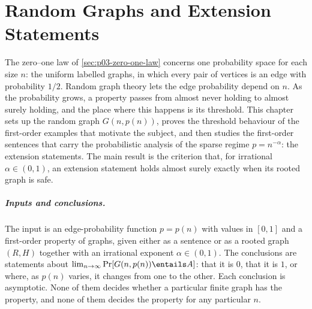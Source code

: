 \chapter{Random Graphs and Extension Statements}
\label{sec:p03-w03-p03-065-random-graphs}

The zero--one law of \cref{sec:p03-zero-one-law} concerns one probability
space for each size \(n\): the uniform labelled graphs, in which every pair of
vertices is an edge with probability \(1/2\).  Random graph theory lets the
edge probability depend on \(n\).  As the probability grows, a property passes
from almost never holding to almost surely holding, and the place where this
happens is its threshold.  This chapter sets up the random graph
\(G(n,p(n))\), proves the threshold behaviour of the first-order examples
that motivate the subject, and then studies the first-order sentences that
carry the probabilistic analysis of the sparse regime \(p=n^{-\alpha}\): the
extension statements.  The main result is the criterion that, for irrational
\(\alpha\in(0,1)\), an extension statement holds almost surely exactly when its
rooted graph is safe.

\paragraph{Inputs and conclusions.}
The input is an edge-probability function \(p=p(n)\) with values in
\([0,1]\) and a first-order property of graphs, given either as a sentence or
as a rooted graph \((R,H)\) together with an irrational exponent
\(\alpha\in(0,1)\).  The conclusions are statements about
\(\lim_{n\to\infty}\Pr[G(n,p(n))\entails A]\): that it is \(0\), that it is
\(1\), or where, as \(p(n)\) varies, it changes from one to the other.  Each
conclusion is asymptotic.  None of them decides whether a particular finite
graph has the property, and none of them decides the property for any
particular \(n\).

